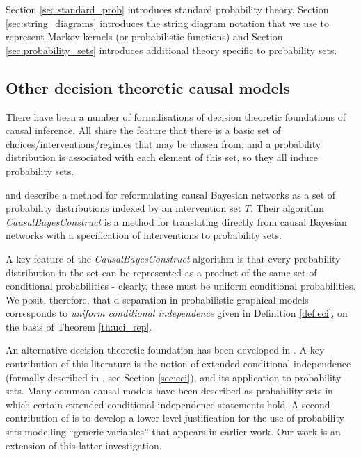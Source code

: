 Section \ref{sec:standard_prob} introduces standard probability theory, Section \ref{sec:string_diagrams} introduces the string diagram notation that we use to represent Markov kernels (or probabilistic functions) and Section \ref{sec:probability_sets} introduces additional theory specific to probability sets.

\subsection{Other decision theoretic causal models}

There have been a number of formalisations of decision theoretic foundations of causal inference. All share the feature that there is a basic set of choices/interventions/regimes that may be chosen from, and a probability distribution is associated with each element of this set, so they all induce probability sets. 

\citet{lattimore_causal_2019} and \citet{lattimore_replacing_2019} describe a method for reformulating causal Bayesian networks as a set of probability distributions indexed by an intervention set $T$. Their algorithm \emph{CausalBayesConstruct} is a method for translating directly from causal Bayesian networks with a specification of interventions to probability sets.

A key feature of the \emph{CausalBayesConstruct} algorithm is that every probability distribution in the set can be represented as a product of the same set of conditional probabilities - clearly, these must be uniform conditional probabilities. We posit, therefore, that d-separation in probabilistic graphical models corresponds to \emph{uniform conditional independence} given in Definition \ref{def:eci}, on the basis of Theorem \ref{th:uci_rep}.

An alternative decision theoretic foundation has been developed in \citet{dawid_decision-theoretic_2020,dawid_beware_2010,dawid_causal_2000}. A key contribution of this literature is the notion of extended conditional independence (formally described in \citet{constantinou_extended_2017}, see Section \ref{sec:eci}), and its application to probability sets. Many common causal models have been described as probability sets in which certain extended conditional independence statements hold. A second contribution of \citet{dawid_decision-theoretic_2020} is to develop a lower level justification for the use of probability sets modelling ``generic variables'' that appears in earlier work. Our work is an extension of this latter investigation.

